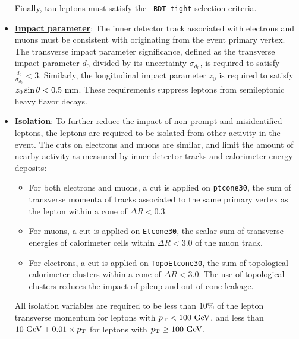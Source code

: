 \begin{itemize}
	Finally, tau leptons must satisfy the \texttt{ BDT-tight} selection criteria.

	\item \underline{\textbf{Impact parameter}}: The inner detector track associated with electrons and muons must be consistent with originating from the event primary vertex. The transverse impact parameter significance, defined as the transverse impact parameter $d_0$ divided by its uncertainty $\sigma_{d_0}$, is required to satisfy $\frac{d_0}{\sigma_{d_0}}<3$. Similarly, the longitudinal impact parameter $z_0$ is required to satisfy $z_0\sin\theta < 0.5~\mathrm{mm}$. These requirements suppress leptons from semileptonic heavy flavor decays. 

	\item \underline{\textbf{Isolation}}: To further reduce the impact of non-prompt and misidentified leptons, the leptons are required to be isolated from other activity in the event. The cuts on electrons and muons are similar, and limit the amount of nearby activity as measured by inner detector tracks and calorimeter energy deposits:

	\begin{itemize}
		\item For both electrons and muons, a cut is applied on \verb.ptcone30., the sum of transverse momenta of tracks associated to the same primary vertex as the lepton within a cone of $\Delta R<0.3$. 
		\item For muons, a cut is applied on \verb.Etcone30., the scalar sum of transverse energies of calorimeter cells within $\Delta R<3.0$ of the muon track. 
		\item For electrons, a cut is applied on \verb.TopoEtcone30., the sum of topological calorimeter clusters within a cone of $\Delta R < 3.0$. The use of topological clusters reduces the impact of pileup and out-of-cone leakage. 
	\end{itemize}

	All isolation variables are required to be less than $10\%$ of the lepton transverse momentum for leptons with $p_{\text{T}}<100~\mbox{GeV}$, and less than $10~\mbox{GeV}+0.01\times p_{\text{T}}$ for leptons with $p_{\text{T}}\geq 100~\mbox{GeV}$. 
\end{itemize}

